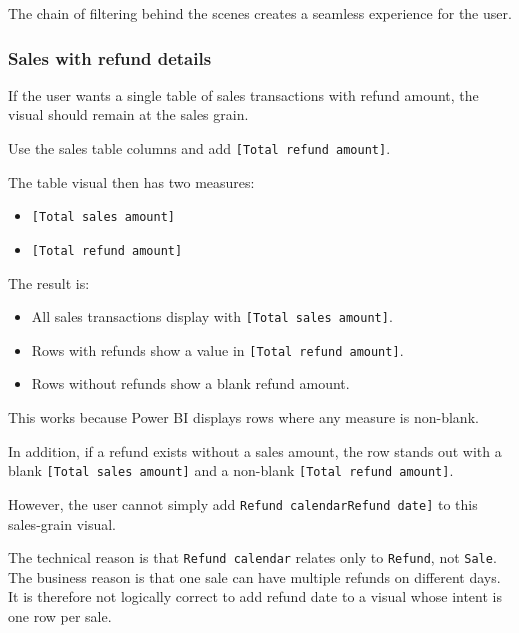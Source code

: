 \documentclass[10pt,openany,10pt]{book}
\providecommand{\tightlist}{%
  \setlength{\itemsep}{0pt}\setlength{\parskip}{0pt}}
\begin{document}
The chain of filtering behind the scenes creates a seamless experience
for the user.

\subsubsection{Sales with refund
details}\label{sales-with-refund-details}

If the user wants a single table of sales transactions with refund
amount, the visual should remain at the sales grain.

Use the sales table columns and add
\texttt{{[}Total\ refund\ amount{]}}.

The table visual then has two measures:

\begin{itemize}
\tightlist
\item
  \texttt{{[}Total\ sales\ amount{]}}
\item
  \texttt{{[}Total\ refund\ amount{]}}
\end{itemize}

The result is:

\begin{itemize}
\tightlist
\item
  All sales transactions display with
  \texttt{{[}Total\ sales\ amount{]}}.
\item
  Rows with refunds show a value in
  \texttt{{[}Total\ refund\ amount{]}}.
\item
  Rows without refunds show a blank refund amount.
\end{itemize}

This works because Power BI displays rows where any measure is
non-blank.

In addition, if a refund exists without a sales amount, the row stands
out with a blank \texttt{{[}Total\ sales\ amount{]}} and a non-blank
\texttt{{[}Total\ refund\ amount{]}}.

However, the user cannot simply add
\texttt{\textquotesingle{}Refund\ calendar\textquotesingle{}{[}Refund\ date{]}}
to this sales-grain visual.

The technical reason is that
\texttt{\textquotesingle{}Refund\ calendar\textquotesingle{}} relates
only to \texttt{\textquotesingle{}Refund\textquotesingle{}}, not
\texttt{\textquotesingle{}Sale\textquotesingle{}}. The business reason
is that one sale can have multiple refunds on different days. It is
therefore not logically correct to add refund date to a visual whose
intent is one row per sale.
\end{document}
